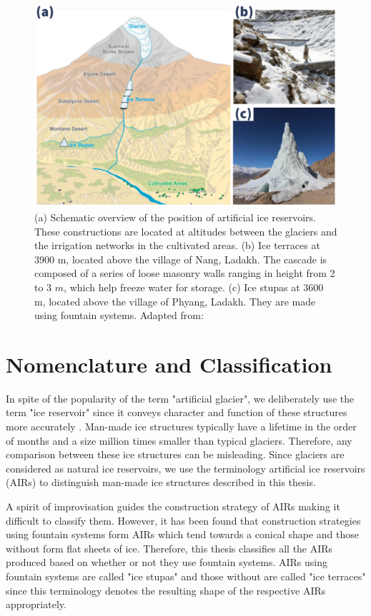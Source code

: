 \begin{figure}[t]
\centering
\includegraphics[width=12cm]{Figures/AIR_forms.jpg}

\caption{(a) Schematic overview of the position of artificial ice reservoirs. These constructions are located at
  altitudes between the glaciers and the irrigation networks in the cultivated areas. (b) Ice terraces at 3900
  m, located above the village of Nang, Ladakh. The cascade is composed of a series of loose masonry walls
  ranging in height from 2 to 3 $m$, which help freeze water for storage. (c) Ice stupas at 3600 m, located
above the village of Phyang, Ladakh. They are made using fountain systems. Adapted from:
\cite{nusserLocalKnowledgeGlobal2016}}

\label{fig:AIRforms}
\end{figure}

\section{Nomenclature and Classification}

In spite of the popularity of the term "artificial glacier", we deliberately use the term "ice reservoir" since
it conveys character and function of these structures more accurately
\citep{nusserSociohydrologyArtificialGlaciers2019}. Man-made ice structures typically have a lifetime in the
order of months and a size million times smaller than typical glaciers. Therefore, any comparison between these
ice structures can be misleading. Since glaciers are considered as natural ice reservoirs, we use the
terminology artificial ice reservoirs (AIRs) to distinguish man-made ice structures described in this thesis. 

A spirit of improvisation guides the construction strategy of AIRs making it difficult to classify them.
However, it has been found that construction strategies using fountain systems form AIRs which tend towards a
conical shape and those without form flat sheets of ice. Therefore, this thesis classifies all the AIRs produced
based on whether or not they use fountain systems. AIRs using fountain systems are called "ice stupas" and those
without are called "ice terraces" since this terminology denotes the resulting shape of the respective AIRs
appropriately.

